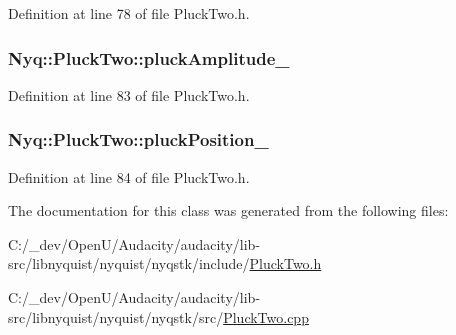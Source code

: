 Definition at line 78 of file Pluck\+Two.\+h.

\subsubsection[{\texorpdfstring{pluck\+Amplitude\+\_\+}{pluckAmplitude_}}]{ Nyq\+::\+Pluck\+Two\+::pluck\+Amplitude\+\_\+\hspace{0.3cm}{\ttfamily [protected]}}\hypertarget{class_nyq_1_1_pluck_two_afd53362886352d4d2953b20f21f497c4}{}\label{class_nyq_1_1_pluck_two_afd53362886352d4d2953b20f21f497c4}


Definition at line 83 of file Pluck\+Two.\+h.

\subsubsection[{\texorpdfstring{pluck\+Position\+\_\+}{pluckPosition_}}]{ Nyq\+::\+Pluck\+Two\+::pluck\+Position\+\_\+\hspace{0.3cm}{\ttfamily [protected]}}\hypertarget{class_nyq_1_1_pluck_two_a7b248637bfee376fe654173e7dddcc30}{}\label{class_nyq_1_1_pluck_two_a7b248637bfee376fe654173e7dddcc30}


Definition at line 84 of file Pluck\+Two.\+h.



The documentation for this class was generated from the following files\+:\begin{DoxyCompactItemize}
\item 
C\+:/\+\_\+dev/\+Open\+U/\+Audacity/audacity/lib-\/src/libnyquist/nyquist/nyqstk/include/\hyperlink{_pluck_two_8h}{Pluck\+Two.\+h}\item 
C\+:/\+\_\+dev/\+Open\+U/\+Audacity/audacity/lib-\/src/libnyquist/nyquist/nyqstk/src/\hyperlink{_pluck_two_8cpp}{Pluck\+Two.\+cpp}\end{DoxyCompactItemize}
